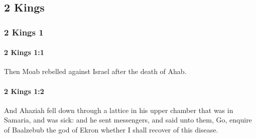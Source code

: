 \subsection{2 Kings}
	\label{2KINGS}

	\subsubsection{2 Kings 1} %
		\label{2KINGS-1}

		\paragraph{2 Kings 1:1} %
			\label{2KINGS-1-1}

			Then Moab rebelled against Israel after the death of Ahab.


		\paragraph{2 Kings 1:2} %
			\label{2KINGS-1-2}

			And Ahaziah fell down through a lattice in his upper chamber that was in Samaria, and was sick: and he sent messengers, and said unto them, Go, enquire of Baalzebub the god of Ekron whether I shall recover of this disease.

